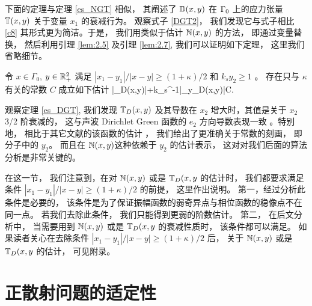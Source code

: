 下面的定理与定理 \ref{es_NGT} 相似， 其阐述了 $\mathbb{D}(x,y)$ 在 $\Gamma_0$ 上的应力张量 $\mathbb{T}(x,y)$ 关于变量 $x_1$ 的衰减行为。 观察式子 \ref{DGT2}， 我们发现它与式子相比 \ref{c8} 其形式更为简洁。于是， 我们用类似于估计 $\mathbb{N}(x,y)$ 的方法， 即通过变量替换， 然后利用引理 \ref{lem:2.5} 及引理 \ref{lem:2.7}, 我们可以证明如下定理， 这里我们省略细节。

\begin{thm}\label{es_DGT}
	令 $x\in\Gamma_0$, $y\in\mathbb{R}_+^2$ 满足 $|x_1-y_1|/|x-y|\ge (1+\kappa)/2$ 和 $k_s y_2\ge 1$ 。 存在只与 $\kappa$ 有关的常数 $C$ 成立如下估计
	\ben
	|\T_D(x,y)|+k_s^{-1}|\na_y\T_D(x,y)|\leq C.
	\een
\end{thm}
观察定理 \ref{es_DGT}, 我们发现 $\mathbb{T}_D(x,y)$ 及其导数在 $x_2$ 增大时，其值是关于 $x_2$ 3/2 阶衰减的， 这与声波 Dirichlet Green 函数的 $e_2$ 方向导数表现一致 \cite{RTMhalf_aco} 。特别地， 相比于其它文献的该函数的估计 \cite[Lemma 2.2]{arens1999}， 我们给出了更准确关于常数的刻画， 即分子中的 $y_2$。 而且在 $\mathbb{N}(x,y )$这种依赖于 $y_2$ 的估计表示， 这对对我们后面的算法分析是非常关键的。
\begin{remark}
在这一节， 我们注意到，在对 $\mathbb{N}(x,y)$ 或是 $\mathbb{T}_D(x,y$ 的估计时， 我们都要求满足条件 $|x_1-y_1|/|x-y|\ge (1+\kappa)/2$ 的前提， 这里作出说明。 第一，经过分析此条件是必要的， 该条件是为了保证振幅函数的弱奇异点与相位函数的稳像点不在同一点。 若我们去除此条件， 我们只能得到更弱的阶数估计。 第二， 在后文分析中， 当需要用到 $\mathbb{N}(x,y)$ 或是 $\mathbb{T}_D(x,y$ 的衰减性质时， 该条件都可以满足。 如果读者关心在去除条件 $|x_1-y_1|/|x-y|\ge (1+\kappa)/2$ 后， 关于 $\mathbb{N}(x,y)$ 或是 $\mathbb{T}_D(x,y$ 的估计， 可见附录。
\end{remark}
\section{正散射问题的适定性}

